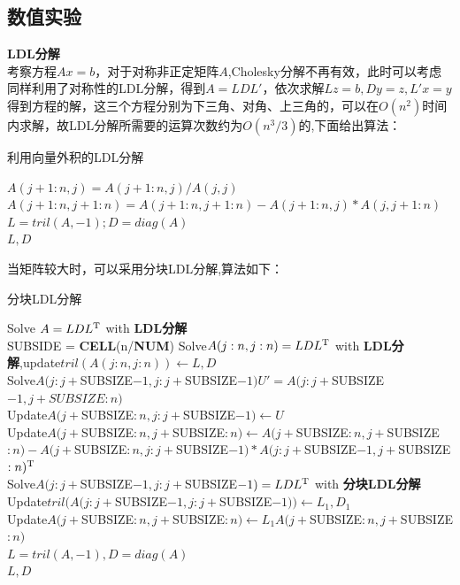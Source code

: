 \documentclass[12pt]{ctexart}
\begin{document}
\subsection{数值实验}
\noindent \textbf{LDL分解}\\
考察方程$Ax=b$，对于对称非正定矩阵$A$,Cholesky分解不再有效，此时可以考虑同样利用了对称性的LDL分解，得到$A=LDL'$，依次求解$Lz=b,Dy=z,L'x=y$得到方程的解，这三个方程分别为下三角、对角、上三角的，可以在$O(n^2)$时间内求解，故LDL分解所需要的运算次数约为$O(n^3/3)$的,下面给出算法：\\
\begin{algorithm}[H]
	\caption{利用向量外积的LDL分解}  
	\label{alg:gaxpy ldl}
	{ 
		$A(j+1:n,j) = A(j+1:n,j)/A(j,j)$\\
		$A(j+1:n,j+1:n) = A(j+1:n,j+1:n)-A(j+1:n,j)*A(j,j+1:n)$\\	
	}  
	$L = tril(A,-1); D = diag(A)$\\
	\Return $L,D$\;
\end{algorithm}
当矩阵较大时，可以采用分块LDL分解,算法如下：\\
\begin{algorithm}[H]
	\caption{分块LDL分解}  
	\label{alg:chunk LDL}
	{
			Solve $A=LDL^{\rm T}$ with  \textbf{LDL分解}\\
	}  
	SUBSIDE = \textbf{CELL}(n/\textbf{NUM})
	{ 
		{
			Solve$ A(j:n,j:n) = LDL^{\rm T} $ with \textbf{LDL分解},update$ tril(A(j:n,j:n))\gets L,D$\\
		}
		\Else
		{
			Solve$ A(j:j+$SUBSIZE$-1,j:j+$SUBSIZE$-1)U'= A(j:j+$SUBSIZE$-1,j+SUBSIZE:n) $\\
			Update$A(j+$SUBSIZE$:n,j:j+$SUBSIZE$-1)\gets U $\\
			Update$A(j+$SUBSIZE$:n,j+$SUBSIZE$:n)\gets A(j+$SUBSIZE$:n,j+$SUBSIZE$:n)-A(j+$SUBSIZE$:n,j:j+$SUBSIZE$-1)*A(j:j+$SUBSIZE$-1,j+$SUBSIZE$:n)^{\rm T} $\\
			Solve$A(j:j+$SUBSIZE$-1,j:j+$SUBSIZE$-1) = LDL^{\rm T}$ with \textbf{分块LDL分解}\\
			Update$tril(A(j:j+$SUBSIZE$-1,j:j+$SUBSIZE$-1)) \gets L_1,D_1$\\
			Update$A(j+$SUBSIZE$:n,j+$SUBSIZE$:n)\gets L_1A(j+$SUBSIZE$:n,j+$SUBSIZE$:n)$\\
		}
		$L = tril(A,-1),D=diag(A)$\\
	}  
	\Return $L,D$\;
\end{algorithm}
\end{document}
